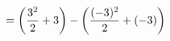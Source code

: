 \documentclass[preview]{standalone}
\begin{document}
\begin{align*}
\special{dvisvgm:raw <g id='unique000'>}&= \left(\frac{3^2}{2} + 3\right) - \left(\frac{(-3)^2}{2} + (-3)\right)\special{dvisvgm:raw </g>}
\end{align*}
\end{document}
